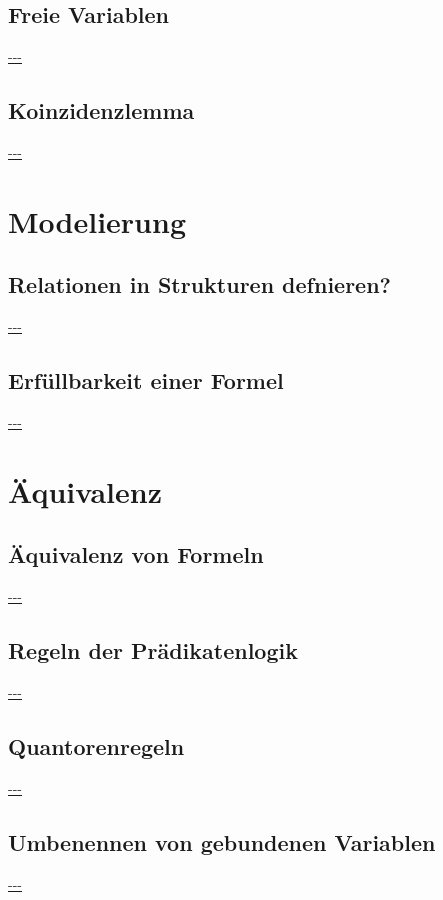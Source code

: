 \documentclass[twocolumn]{article}
\begin{document}
    \subsection{Freie Variablen}
    \url{---}\\

    \subsection{Koinzidenzlemma}
    \url{---}\\

    \section{Modelierung}

    \subsection{Relationen in Strukturen defnieren?}
    \url{---}\\

    \subsection{Erfüllbarkeit einer Formel}
    \url{---}\\

    \section{Äquivalenz}

    \subsection{Äquivalenz von Formeln}
    \url{---}\\

    \subsection{Regeln der Prädikatenlogik}
    \url{---}\\

    \subsection{Quantorenregeln}
    \url{---}\\

    \subsection{Umbenennen von gebundenen Variablen}
    \url{---}\\
\end{document}
